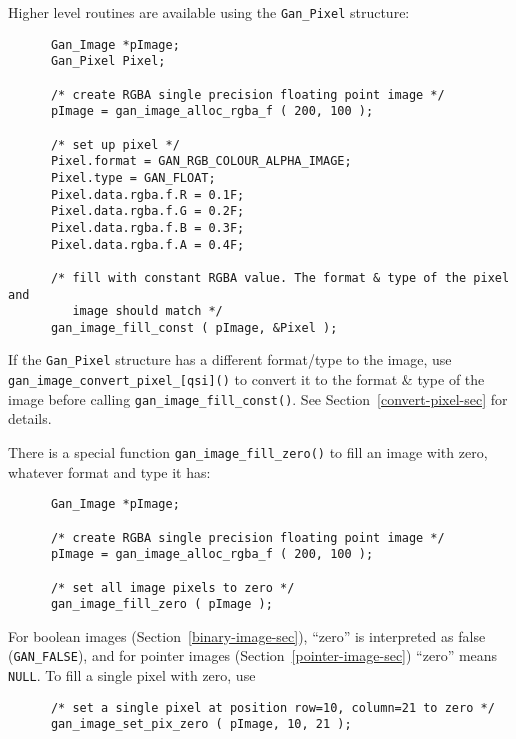 Higher level routines are available using the {\tt Gan\_Pixel} structure:
\begin{verbatim}
      Gan_Image *pImage;
      Gan_Pixel Pixel;

      /* create RGBA single precision floating point image */
      pImage = gan_image_alloc_rgba_f ( 200, 100 );

      /* set up pixel */
      Pixel.format = GAN_RGB_COLOUR_ALPHA_IMAGE;
      Pixel.type = GAN_FLOAT;
      Pixel.data.rgba.f.R = 0.1F;
      Pixel.data.rgba.f.G = 0.2F;
      Pixel.data.rgba.f.B = 0.3F;
      Pixel.data.rgba.f.A = 0.4F;

      /* fill with constant RGBA value. The format & type of the pixel and
         image should match */
      gan_image_fill_const ( pImage, &Pixel );
\end{verbatim}

If the {\tt Gan\_Pixel} structure has a different format/type to the
image, use {\tt gan\_image\_convert\_pixel\_[qsi]()} to convert
it to the format \& type of the image before calling
{\tt gan\_image\_fill\_const()}. See Section~\ref{convert-pixel-sec} for
details.

There is a special function {\tt gan\_image\_fill\_zero()} to fill an image
with zero, whatever format and type it has:
\begin{verbatim}
      Gan_Image *pImage;

      /* create RGBA single precision floating point image */
      pImage = gan_image_alloc_rgba_f ( 200, 100 );

      /* set all image pixels to zero */
      gan_image_fill_zero ( pImage );
\end{verbatim}

For boolean images (Section~\ref{binary-image-sec}), ``zero'' is interpreted
as false ({\tt GAN\_FALSE}), and for pointer images
(Section~\ref{pointer-image-sec}) ``zero'' means {\tt NULL}.
To fill a single pixel with zero, use
\begin{verbatim}
      /* set a single pixel at position row=10, column=21 to zero */
      gan_image_set_pix_zero ( pImage, 10, 21 );
\end{verbatim}

